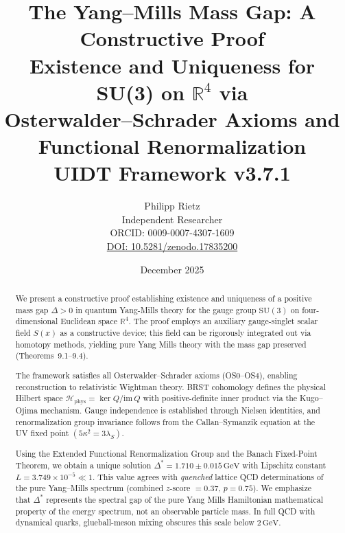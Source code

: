 \documentclass[11pt,a4paper]{article}
\title{%
\textbf{The Yang--Mills Mass Gap: A Constructive Proof}\\[0.4cm]
{\large Existence and Uniqueness for SU(3) on $\mathbb{R}^4$ via}\\[0.2cm]
{\large Osterwalder--Schrader Axioms and Functional Renormalization}\\[0.6cm]
{\normalsize UIDT Framework v3.7.1}}
\author{%
Philipp Rietz\\[0.3cm]
\small Independent Researcher\\
\small ORCID: 0009-0007-4307-1609\\
\small \href{https://doi.org/10.5281/zenodo.17835200}{DOI: 10.5281/zenodo.17835200}
}
\date{December 2025}
\theoremstyle{plain}
\theoremstyle{definition}
\begin{document}

\maketitle
\thispagestyle{empty}

\begin{abstract}
\noindent
We present a constructive proof establishing existence and uniqueness of a positive mass gap $\Delta > 0$ in quantum Yang-Mills theory for the gauge group $\mathrm{SU}(3)$ on four-dimensional Euclidean space $\mathbb{R}^4$. The proof employs an auxiliary gauge-singlet scalar field $S(x)$ as a constructive device; this field can be rigorously integrated out via homotopy methods, yielding pure Yang Mills theory with the mass gap preserved (Theorems~9.1--9.4).
\\ \vspace{0.3em} 

The framework satisfies all Osterwalder--Schrader axioms (OS0--OS4), enabling reconstruction to relativistic Wightman theory. BRST cohomology defines the physical Hilbert space $\mathcal{H}_{\mathrm{phys}} = \ker Q / \mathrm{im}\, Q$ with positive-definite inner product via the Kugo--Ojima mechanism. Gauge independence is established through Nielsen identities, and renormalization group invariance follows from the Callan--Symanzik equation at the UV fixed point $(5\kappa^2 = 3\lambda_S)$.
\\ \vspace{0.3em} 

Using the Extended Functional Renormalization Group and the Banach Fixed-Point Theorem, we obtain a unique solution $\Delta^* = 1.710 \pm 0.015\,\mathrm{GeV}$ with Lipschitz constant $L = 3.749 \times 10^{-5} \ll 1$. This value agrees with \emph{quenched} lattice QCD determinations of the pure Yang--Mills spectrum (combined $z$-score $= 0.37$, $p = 0.75$). We emphasize that $\Delta^*$ represents the spectral gap of the pure Yang Mills Hamiltonian mathematical property of the energy spectrum, not an observable particle mass. In full QCD with dynamical quarks, glueball-meson mixing obscures this scale below $2\,\mathrm{GeV}$.
\end{abstract}
\newpage
\tableofcontents
\newpage

\end{document}
